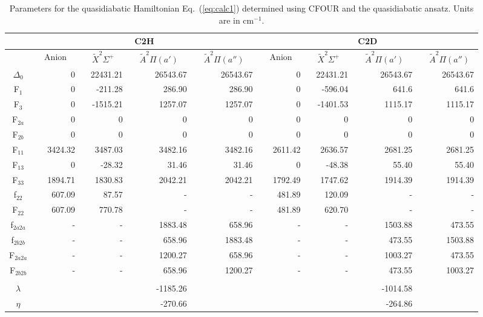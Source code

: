 \documentclass[aip,graphicx]{revtex4-1}
\begin{document}
\begin{table}
	\caption{Parameters for the quasidiabatic Hamiltonian Eq.~(\ref{eq:calc1}) determined using CFOUR and the quasidiabatic ansatz. Units are in cm$^{-1}$.}
	\label{tab:1}

	\begin{tabular}{c | r r r r | r r r r} 
		\hline
		& \multicolumn{4}{c}{C2H} & \multicolumn{4}{c}{C2D}\\
		\hline
		& ~~Anion~~ & ~~$\tilde{X}^2\Sigma^+$~~ & ~~$\tilde{A}^2\Pi (a')$~~ & ~~$\tilde{A}^2\Pi (a'')$~~ & ~~Anion~~ & ~~$\tilde{X}^2\Sigma^+$~~ & ~~$\tilde{A}^2\Pi (a')$~~ & ~~$\tilde{A}^2\Pi (a'')$~  \\
		\hline
		$\Delta_0$ & 0& 22431.21&  26543.67& 26543.67& 0 & 22431.21& 26543.67& 26543.67 \\
		F$_1$ &  0& -211.28& 286.90& 286.90& 0& -596.04& 641.6& 641.6\\
		F$_3$ &  0& -1515.21&  1257.07& 1257.07& 0& -1401.53& 1115.17& 1115.17\\
		F$_{2a}$& 0 & 0& 0& 0& 0& 0& 0&0 \\
		F$_{2b}$&  0& 0& 0& 0& 0& 0& 0&0 \\
		F$_{11}$& 3424.32 &  3487.03& 3482.16& 3482.16& 2611.42&  2636.57& 2681.25& 2681.25\\
		F$_{13}$&  0 & -28.32& 31.46& 31.46& 0& -48.38& 55.40& 55.40\\
		F$_{33}$& 1894.71 & 1830.83& 2042.21& 2042.21& 1792.49&  1747.62& 1914.39& 1914.39\\
		f$_{22}$& 607.09&  87.57& -& -& 481.89&  120.09& -& -\\
		F$_{22}$& 607.09 & 770.78& -& -& 481.89& 620.70& -& -\\
		f$_{2a2a}$& - &- & 1883.48& 658.96& -& -& 1503.88& 473.55\\
		f$_{2b2b}$& - &- & 658.96& 1883.48& -& -& 473.55& 1503.88\\
		F$_{2a2a}$& -& -& 1200.27& 658.96& -& -& 1003.27& 473.55\\
		F$_{2b2b}$& -& -& 658.96& 1200.27& -& -& 473.55& 1003.27\\
		&&&&&&&& \\
		$\lambda$& & & -1185.26& & & & -1014.58& \\
		$\eta$ & & & -270.66& & & & -264.86& \\
		
	\end{tabular}
\end{table}
\end{document}
